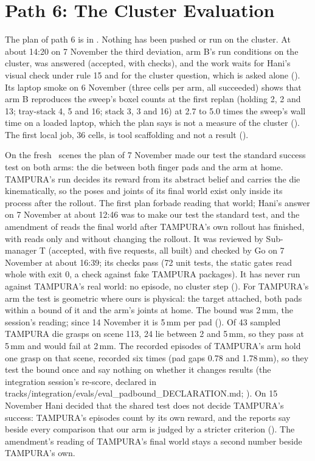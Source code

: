 \section{Path 6: The Cluster Evaluation}
\label{sec:path6}

The plan of path 6 is in . Nothing has been pushed or run on
the cluster. At about 14:20 on 7 November the third deviation, arm B's run conditions
on the cluster, was answered (accepted, with checks), and the work waits for Hani's
visual check under rule 15 and for the cluster question, which is asked alone
(). Its laptop smoke on 6 November (three cells per arm, all succeeded) shows
that arm B reproduces the sweep's boxel counts at the first replan (holding 2, 2 and
13; tray-stack 4, 5 and 16; stack 3, 3 and 16) at 2.7 to 5.0 times the sweep's wall
time on a loaded laptop, which the plan says is not a measure of the cluster ().
The first local job, 36 cells, is tool scaffolding and not a result ().

On the fresh \fdice\ scenes the plan of 7 November made our test the standard success
test on both arms: the die between both finger pads and the arm at home. TAMPURA's run decides its reward from
its abstract belief and carries the die kinematically, so the poses and joints of its
final world exist only inside its process after the rollout. The first plan forbade
reading that world; Hani's answer on 7 November at about 12:46 was to make our test the
standard test, and the amendment of  reads the final world after TAMPURA's own
rollout has finished, with reads only and without changing the rollout. It was reviewed
by Sub-manager T (accepted, with five requests, all built) and checked by Go on 7
November at about 16:39; its checks pass (72 unit tests, the static gates read whole
with exit 0, a check against fake TAMPURA packages). It has never run against TAMPURA's
real world: no episode, no cluster step (). For TAMPURA's arm the test is geometric where ours is physical:
the target attached, both pads within a bound of it and the arm's joints at home. The
bound was 2\,mm, the session's reading; since 14 November it is 5\,mm per pad ().
Of 43 sampled TAMPURA die grasps on scene 113, 24 lie between 2 and 5\,mm, so they
pass at 5\,mm and would fail at 2\,mm. The recorded episodes of TAMPURA's arm hold one
grasp on that scene, recorded six times (pad gaps 0.78 and 1.78\,mm), so they test the
bound once and say nothing on whether it changes results (the integration session's
re-score, declared in tracks/integration/evals/eval\_padbound\_DECLARATION.md;
).
On 15 November Hani decided that the shared test does not decide TAMPURA's success:
TAMPURA's episodes count by its own reward, and the reports say beside every
comparison that our arm is judged by a stricter criterion (). The amendment's reading of TAMPURA's final world stays a second number
beside TAMPURA's own.

